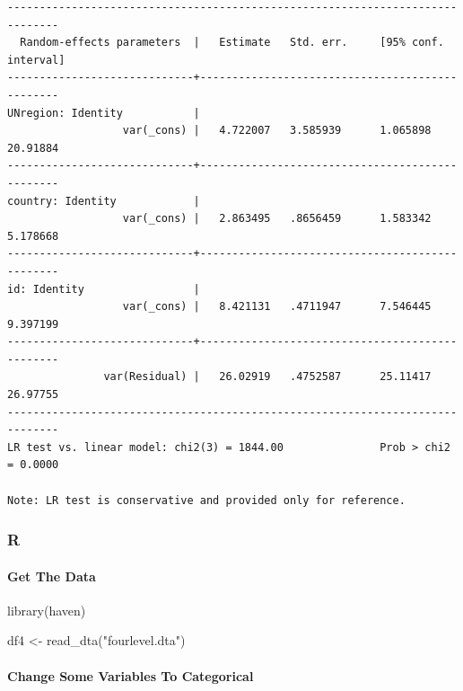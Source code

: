 \documentclass[
  letterpaper,
  DIV=11,
  numbers=noendperiod]{scrreprt}
\let\oldparagraph\paragraph
\renewcommand{\paragraph}[1]{\oldparagraph{#1}\mbox{}}
\newenvironment{Shaded}{\begin{snugshade}}{\end{snugshade}}
\newcommand{\FunctionTok}[1]{\textcolor[rgb]{0.28,0.35,0.67}{#1}}
\newcommand{\NormalTok}[1]{\textcolor[rgb]{0.00,0.23,0.31}{#1}}
\newcommand{\OtherTok}[1]{\textcolor[rgb]{0.00,0.23,0.31}{#1}}
\newcommand{\SpecialCharTok}[1]{\textcolor[rgb]{0.37,0.37,0.37}{#1}}
\newcommand{\StringTok}[1]{\textcolor[rgb]{0.13,0.47,0.30}{#1}}
\begin{document}
\begin{verbatim}
------------------------------------------------------------------------------
  Random-effects parameters  |   Estimate   Std. err.     [95% conf. interval]
-----------------------------+------------------------------------------------
UNregion: Identity           |
                  var(_cons) |   4.722007   3.585939      1.065898    20.91884
-----------------------------+------------------------------------------------
country: Identity            |
                  var(_cons) |   2.863495   .8656459      1.583342    5.178668
-----------------------------+------------------------------------------------
id: Identity                 |
                  var(_cons) |   8.421131   .4711947      7.546445    9.397199
-----------------------------+------------------------------------------------
               var(Residual) |   26.02919   .4752587      25.11417    26.97755
------------------------------------------------------------------------------
LR test vs. linear model: chi2(3) = 1844.00               Prob > chi2 = 0.0000

Note: LR test is conservative and provided only for reference.
\end{verbatim}

\subsubsection{R}

\paragraph{Get The Data}\label{get-the-data-9}

\begin{Shaded}
\begin{Highlighting}[]
\FunctionTok{library}\NormalTok{(haven)}

\NormalTok{df4 }\OtherTok{\textless{}{-}} \FunctionTok{read\_dta}\NormalTok{(}\StringTok{"fourlevel.dta"}\NormalTok{)}
\end{Highlighting}
\end{Shaded}

\paragraph{Change Some Variables To
Categorical}\label{change-some-variables-to-categorical-5}

\begin{Shaded}
\end{Shaded}
\end{document}

